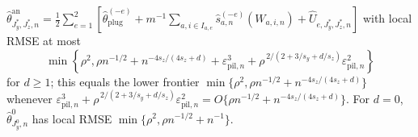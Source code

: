 \(\widehat\theta^{\mathrm{an}}_{J_y^*,J_z^*,n}=\frac12\sum_{e=1}^2[\widehat\theta_{\mathrm{plug}}^{(-e)}+m^{-1}\sum_{a,i\in I_{a,e}}\widehat s_{a,n}^{(-e)}(W_{a,i,n})+\widehat U_{e,J_y^*,J_z^*,n}]\) with local RMSE at most
\[
\min\!\left\{\rho^2,\rho n^{-1/2}+n^{-4s_z/(4s_z+d)}
+\varepsilon_{\mathrm{pil},n}^3+\rho^{\,2/(2+3/s_y+d/s_z)}\varepsilon_{\mathrm{pil},n}^2\right\}
\]
for \(d\ge1\); this equals the lower frontier \(\min\{\rho^2,\rho n^{-1/2}+n^{-4s_z/(4s_z+d)}\}\) whenever \(\varepsilon_{\mathrm{pil},n}^3+\rho^{\,2/(2+3/s_y+d/s_z)}\varepsilon_{\mathrm{pil},n}^2=O\{\rho n^{-1/2}+n^{-4s_z/(4s_z+d)}\}\).  For \(d=0\), \(\widehat\theta^0_{J_y^0,n}\) has local RMSE \(\min\{\rho^2,\rho n^{-1/2}+n^{-1}\}\).